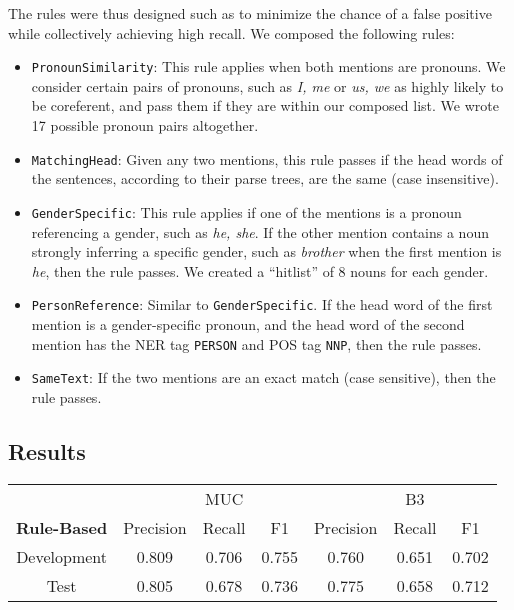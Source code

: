 \documentclass[12pt]{article}
\begin{document}
The rules were thus designed such as to minimize the chance of a false positive while collectively achieving high recall. We composed the following rules:
\begin{itemize}
\item \texttt{PronounSimilarity}: This rule applies when both mentions are pronouns. We consider certain pairs of pronouns, such as \emph{I, me} or \emph{us, we} as highly likely to be coreferent, and pass them if they are within our composed list. We wrote 17 possible pronoun pairs altogether.

\item \texttt{MatchingHead}: Given any two mentions, this rule passes if the head words of the sentences, according to their parse trees, are the same (case insensitive).

\item  \texttt{GenderSpecific}: This rule applies if one of the mentions is a pronoun referencing a gender, such as \emph{he, she}. If the other mention contains a noun strongly inferring a specific gender, such as \emph{brother} when the first mention is \emph{he}, then the rule passes. We created a ``hitlist'' of 8 nouns for each gender.

\item \texttt{PersonReference}: Similar to \texttt{GenderSpecific}. If the head word of the first mention is a gender-specific pronoun, and the head word of the second mention has the NER tag \texttt{PERSON} and POS tag \texttt{NNP}, then the rule passes.

\item \texttt{SameText}: If the two mentions are an exact match (case sensitive), then the rule passes.
\end{itemize}

\subsection{Results}
\begin{table}[ht] 
\centering %
\begin{tabular}{c | c c c | c c c} 
& & MUC & & & B3 \\ [0.5ex] %
\textbf{Rule-Based} & Precision & Recall & F1 & Precision & Recall & F1 \\ [0.5ex] %
\hline %
Development & 0.809 & 0.706 & 0.755 & 0.760 & 0.651 & 0.702 \\
Test & 0.805 & 0.678 & 0.736 & 0.775 & 0.658 & 0.712\\
\end{tabular} 
\label{table:nonlin}
\end{table}
\end{document}

